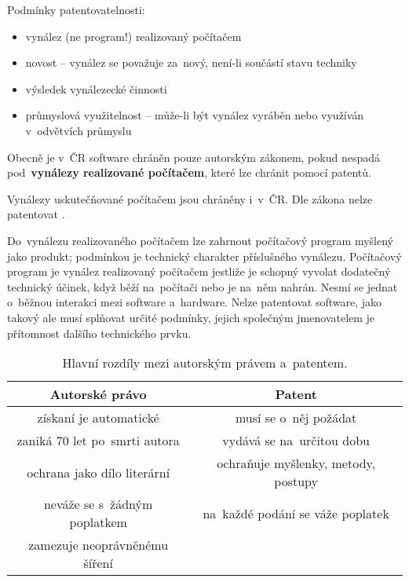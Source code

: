 \noindent Podmínky patentovatelnosti:
\begin{itemize}
	\item vynález (ne program!) realizovaný počítačem
	\item novost -- vynález se považuje za~nový, není-li součástí stavu techniky
	\item výsledek vynálezecké činnosti
	\item průmyslová využitelnost -- může-li být vynález vyráběn nebo využíván v~odvětvích průmyslu
\end{itemize}

Obecně je v~ČR software chráněn pouze autorským zákonem, pokud nespadá pod~\textbf{vynálezy realizované počítačem}, které lze chránit pomocí patentů.

Vynálezy uskutečňované počítačem jsou chráněny i~v~ČR. Dle zákona nelze patentovat \emph{}.

Do~vynálezu realizovaného počítačem lze zahrnout počítačový program myšlený jako produkt; podmínkou je technický charakter příslušného vynálezu. Počítačový program je vynález realizovaný počítačem jestliže je schopný vyvolat dodatečný technický účinek, když běží na~počítači nebo je na~něm nahrán. Nesmí se jednat o~běžnou interakci mezi software a~hardware. Nelze patentovat software, jako takový ale musí splňovat určité podmínky, jejich společným jmenovatelem je přítomnost dalšího technického prvku.

\begin{table}[ht]
	\centering
	\caption{Hlavní rozdíly mezi autorským právem a~patentem.}

	\begin{tabular}{c|c}
		\textbf{Autorské právo}       & \textbf{Patent}                     \\
		\hline
		získaní je automatické        & musí se o~něj požádat               \\
		zaniká 70 let po~smrti autora & vydává se na~určitou dobu           \\
		ochrana jako dílo literární   & ochraňuje myšlenky, metody, postupy \\
		neváže se s~žádným poplatkem  & na~každé podání se váže poplatek    \\
		zamezuje neoprávněnému šíření &                                     \\
	\end{tabular}
\end{table}

